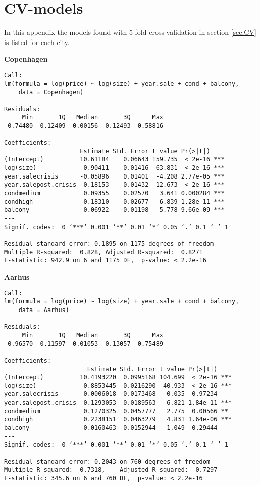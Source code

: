 \chapter{CV-models} \label{aap:cv}
In this appendix the models found with 5-fold cross-validation in section \ref{sec:CV} is listed for each city.

\textbf{Copenhagen}
\begin{lstlisting}
Call:
lm(formula = log(price) ~ log(size) + year.sale + cond + balcony, 
    data = Copenhagen)

Residuals:
     Min       1Q   Median       3Q      Max 
-0.74480 -0.12409  0.00156  0.12493  0.58816 

Coefficients:
                     Estimate Std. Error t value Pr(>|t|)    
(Intercept)          10.61184    0.06643 159.735  < 2e-16 ***
log(size)             0.90411    0.01416  63.831  < 2e-16 ***
year.salecrisis      -0.05896    0.01401  -4.208 2.77e-05 ***
year.salepost.crisis  0.18153    0.01432  12.673  < 2e-16 ***
condmedium            0.09355    0.02570   3.641 0.000284 ***
condhigh              0.18310    0.02677   6.839 1.28e-11 ***
balcony               0.06922    0.01198   5.778 9.66e-09 ***
---
Signif. codes:  0 ‘***’ 0.001 ‘**’ 0.01 ‘*’ 0.05 ‘.’ 0.1 ‘ ’ 1

Residual standard error: 0.1895 on 1175 degrees of freedom
Multiple R-squared:  0.828,	Adjusted R-squared:  0.8271 
F-statistic: 942.9 on 6 and 1175 DF,  p-value: < 2.2e-16
\end{lstlisting}

\textbf{Aarhus}
\begin{lstlisting}
Call:
lm(formula = log(price) ~ log(size) + year.sale + cond + balcony, 
    data = Aarhus)

Residuals:
     Min       1Q   Median       3Q      Max 
-0.96570 -0.11597  0.01053  0.13057  0.75489 

Coefficients:
                       Estimate Std. Error t value Pr(>|t|)    
(Intercept)          10.4193220  0.0995168 104.699  < 2e-16 ***
log(size)             0.8853445  0.0216290  40.933  < 2e-16 ***
year.salecrisis      -0.0006018  0.0173468  -0.035  0.97234    
year.salepost.crisis  0.1293053  0.0189563   6.821 1.84e-11 ***
condmedium            0.1270325  0.0457777   2.775  0.00566 ** 
condhigh              0.2238151  0.0463279   4.831 1.64e-06 ***
balcony               0.0160463  0.0152944   1.049  0.29444    
---
Signif. codes:  0 ‘***’ 0.001 ‘**’ 0.01 ‘*’ 0.05 ‘.’ 0.1 ‘ ’ 1

Residual standard error: 0.2043 on 760 degrees of freedom
Multiple R-squared:  0.7318,	Adjusted R-squared:  0.7297 
F-statistic: 345.6 on 6 and 760 DF,  p-value: < 2.2e-16
\end{lstlisting}

